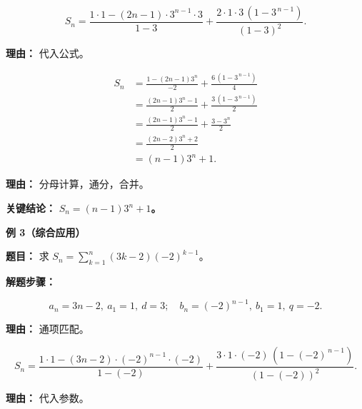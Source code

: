 \begin{examplebox}
\begin{description}[style=nextline, leftmargin=2.8em, labelsep=0.5em, itemsep=0.45em]
		\item[\textbf{第二步（套用公式）：}]
			\[
				S_n = \frac{1\cdot1 - (2n-1)\cdot3^{n-1}\cdot3}{1-3} + \frac{2\cdot1\cdot3\,(1-3^{\,n-1})}{(1-3)^2}.
			\]
			\par\textbf{理由：} 代入公式。

		\item[\textbf{第三步（化简求值）：}]
			\[
				\begin{aligned}
					S_n &= \frac{1 - (2n-1)3^{n}}{-2} + \frac{6\,(1-3^{\,n-1})}{4} \\
					&= \frac{(2n-1)3^{n} - 1}{2} + \frac{3\,(1-3^{\,n-1})}{2} \\
					&= \frac{(2n-1)3^{n} - 1}{2} + \frac{3 - 3^{n}}{2} \\
					&= \frac{(2n-2)3^{n} + 2}{2} \\
					&= (n-1)3^{n} + 1.
			\end{aligned}
			\]
			\par\textbf{理由：} 分母计算，通分，合并。
	\end{description}

	\textbf{\textcolor{CExample}{关键结论：}}
	\textbf{$S_n = (n-1)3^{n} + 1$。}

	\medskip
	\textbf{\textcolor{CExample}{例 3（综合应用）}}

	\textbf{\textcolor{CExample}{题目：}}
	求 $S_n = \sum_{k=1}^{n} (3k-2)(-2)^{k-1}$。

	\textbf{\textcolor{CExample}{解题步骤：}}
	\begin{description}[style=nextline, leftmargin=2.8em, labelsep=0.5em, itemsep=0.45em]
		\item[\textbf{第一步（识别参数）：}]
			\[
				a_n = 3n-2,\ a_1 = 1,\ d = 3;\quad b_n = (-2)^{n-1},\ b_1 = 1,\ q = -2.
			\]
			\par\textbf{理由：} 通项匹配。

		\item[\textbf{第二步（套用公式）：}]
			\[
				S_n = \frac{1\cdot1 - (3n-2)\cdot(-2)^{n-1}\cdot(-2)}{1-(-2)} + \frac{3\cdot1\cdot(-2)\,(1-(-2)^{\,n-1})}{(1-(-2))^2}.
			\]
			\par\textbf{理由：} 代入参数。


\end{description}
\end{examplebox}
